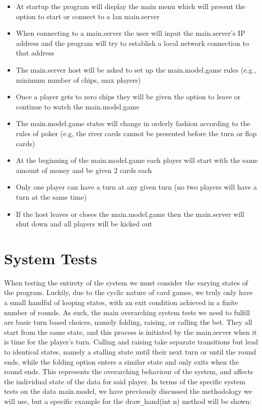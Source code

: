 \documentclass{article}
\begin{document}
\begin{itemize}
\item At startup the program will display the main menu which will present the option to start or connect to a lan main.server
\item When connecting to a main.server the user will input the main.server’s IP address and the program will try to establish a local network connection to that address
\item The main.server host will be asked to set up the main.model.game rules (e.g., minimum number of chips, max players)
\item Once a player gets to zero chips they will be given the option to leave or continue to watch the main.model.game
\item The main.model.game states will change in orderly fashion according to the rules of poker (e.g, the river cards cannot be presented before the turn or flop cards)
\item At the beginning of the main.model.game each player will start with the same amount of money and be given 2 cards each
\item Only one player can have a turn at any given turn (no two players will have a turn at the same time)
\item If the host leaves or closes the main.model.game then the main.server will shut down and all players will be kicked out
\end{itemize}

\section{System Tests}

When testing the entirety of the system we must consider the varying states of the program. Luckily, due to the cyclic nature of card games, we truly only have a small handful of looping states, with an exit condition achieved in a finite number of rounds. As such, the main overarching system tests we need to fulfill are basic turn based choices, namely folding, raising, or calling the bet. They all start from the same state, and this process is initiated by the main.server when it is time for the player's turn. Calling and raising take separate transitions but lead to identical states, namely a stalling state until their next turn or until the round ends, while the folding option enters a similar state and only exits when the round ends. This represents the overarching behaviour of the system, and affects the individual state of the data for said player. In terms of the specific system tests on the data main.model, we have previously discussed the methodology we will use, but a specific example for the draw\verb|_|hand(int n) method will be shown:
\end{document}
